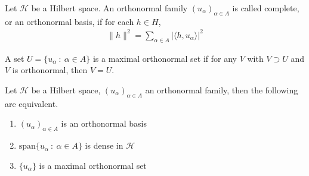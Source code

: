 \begin{definition}
  Let $\mathcal{H}$ be a Hilbert space. An orthonormal family
  $(u_\alpha)_{\alpha \in A}$ is called complete, or an orthonormal
  basis, if for each $h \in H$,
  \begin{align*}
    \|h\|^2 = \sum_{\alpha \in  A} |\langle h , u_\alpha \rangle |^2
  \end{align*}
\end{definition}

\begin{definition}
  A set $U = \{ u_\alpha  \ : \   \alpha \in A \}$ is a maximal
  orthonormal set if for any $V$ with $V \supset U$ and $V$ is
  orthonormal, then $V = U$.
\end{definition}

\begin{theorem}
  Let $\mathcal{H}$ be a Hilbert space, $(u_\alpha)_{\alpha \in A}$
  an orthonormal family, then the following are equivalent.
  \begin{enumerate}
    \item $(u_\alpha)_{\alpha \in A}$ is an orthonormal basis
    \item $\textrm{span}\{ u_\alpha  \ : \   \alpha \in A \}$ is
      dense in $\mathcal{H}$
    \item $\{ u_\alpha \}$ is a maximal orthonormal set
  \end{enumerate}
\end{theorem}
